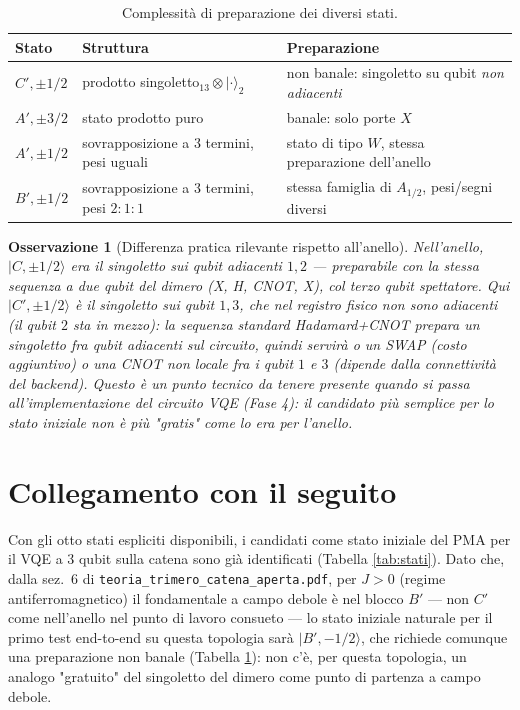 \documentclass[11pt,a4paper]{article}
\newtheorem{osservazione}{Osservazione}
\begin{document}
\begin{table}[h]
\centering
\begin{tabular}{@{}p{1.7cm}p{4.9cm}p{7.9cm}@{}}
\toprule
Stato & Struttura & Preparazione\\
\midrule
$C',\pm1/2$ & prodotto singoletto$_{13}\otimes|\cdot\rangle_2$ & non banale: singoletto su qubit \emph{non adiacenti}\\
$A',\pm3/2$ & stato prodotto puro & banale: solo porte $X$\\
$A',\pm1/2$ & sovrapposizione a 3 termini, pesi uguali & stato di tipo $W$, stessa preparazione dell'anello\\
$B',\pm1/2$ & sovrapposizione a 3 termini, pesi $2{:}1{:}1$ & stessa famiglia di $A_{1/2}$, pesi/segni diversi\\
\bottomrule
\end{tabular}
\caption{Complessità di preparazione dei diversi stati.}
\label{tab:preparazione}
\end{table}

\begin{osservazione}[Differenza pratica rilevante rispetto all'anello]
Nell'anello, $|C,\pm1/2\rangle$ era il singoletto sui qubit \emph{adiacenti}
$1,2$ — preparabile con la stessa sequenza a due qubit del dimero (X, H,
CNOT, X), col terzo qubit spettatore. Qui $|C',\pm1/2\rangle$ è il
singoletto sui qubit $1,3$, che nel registro fisico \emph{non sono
adiacenti} (il qubit $2$ sta in mezzo): la sequenza standard
Hadamard+CNOT prepara un singoletto fra qubit adiacenti sul circuito, quindi
servirà o un SWAP (costo aggiuntivo) o una CNOT non locale fra i qubit $1$
e $3$ (dipende dalla connettività del backend). Questo è un punto tecnico
da tenere presente quando si passa all'implementazione del circuito VQE
(Fase 4): il candidato più semplice per lo stato iniziale non è più "gratis"
come lo era per l'anello.
\end{osservazione}

\section{Collegamento con il seguito}

Con gli otto stati espliciti disponibili, i candidati come stato iniziale
del PMA per il VQE a 3 qubit sulla catena sono già identificati (Tabella
\ref{tab:stati}). Dato che, dalla sez.~6 di \texttt{teoria\_\allowbreak trimero\_\allowbreak catena\_\allowbreak aperta.pdf},
per $J>0$ (regime antiferromagnetico) il fondamentale a campo debole è nel
blocco $B'$ — non $C'$ come nell'anello nel punto di lavoro consueto — lo
stato iniziale naturale per il primo test end-to-end su questa topologia
sarà $|B',-1/2\rangle$, che richiede comunque una preparazione non banale
(Tabella \ref{tab:preparazione}): non c'è, per questa topologia, un analogo "gratuito" del
singoletto del dimero come punto di partenza a campo debole.
\end{document}
